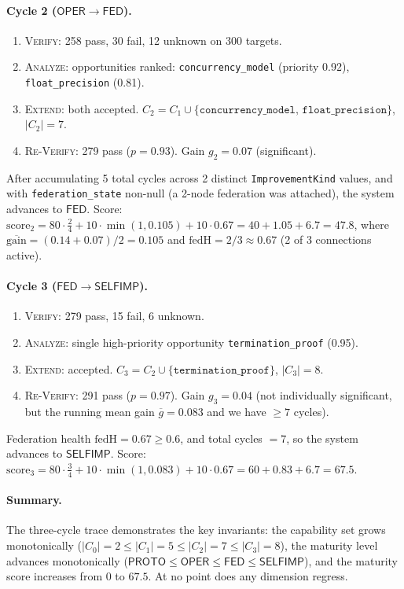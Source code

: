 \documentclass[11pt]{article}
\newcommand{\gain}{\mathrm{gain}}           %
\newcommand{\score}{\mathrm{score}}         %
\newcommand{\fedH}{\mathrm{fedH}}           %
\newcommand{\Proto}{\ensuremath{\mathsf{PROTO}}}
\newcommand{\Oper}{\ensuremath{\mathsf{OPER}}}
\newcommand{\Fed}{\ensuremath{\mathsf{FED}}}
\newcommand{\SelfImp}{\ensuremath{\mathsf{SELFIMP}}}
\newcommand{\Verify}{\textsc{Verify}}
\newcommand{\Analyze}{\textsc{Analyze}}
\newcommand{\Extend}{\textsc{Extend}}
\newcommand{\ReVerify}{\textsc{Re-Verify}}
\begin{document}
\paragraph{Cycle 2 ($\Oper \to \Fed$).}
\begin{enumerate}
  \item \Verify{}: 258 pass, 30 fail, 12 unknown on 300 targets.
  \item \Analyze{}: opportunities ranked: \texttt{concurrency\_model} (priority
    0.92), \texttt{float\_precision} (0.81).
  \item \Extend{}: both accepted. $C_2 = C_1 \cup
    \{\texttt{concurrency\_model},\, \texttt{float\_precision}\}$, $|C_2| = 7$.
  \item \ReVerify{}: 279 pass ($p = 0.93$). Gain $g_2 = 0.07$ (significant).
\end{enumerate}
After accumulating 5 total cycles across 2 distinct \texttt{ImprovementKind}
values, and with \texttt{federation\_state} non-null (a 2-node federation was
attached), the system advances to $\Fed$.  Score:
$\score_2 = 80 \cdot \tfrac{2}{4} + 10 \cdot \min(1, 0.105)
           + 10 \cdot 0.67 = 40 + 1.05 + 6.7 = 47.8$,
where $\overline{\gain} = (0.14 + 0.07)/2 = 0.105$ and
$\fedH = 2/3 \approx 0.67$ (2 of 3 connections active).

\paragraph{Cycle 3 ($\Fed \to \SelfImp$).}
\begin{enumerate}
  \item \Verify{}: 279 pass, 15 fail, 6 unknown.
  \item \Analyze{}: single high-priority opportunity
    \texttt{termination\_proof} (0.95).
  \item \Extend{}: accepted. $C_3 = C_2 \cup \{\texttt{termination\_proof}\}$,
    $|C_3| = 8$.
  \item \ReVerify{}: 291 pass ($p = 0.97$). Gain $g_3 = 0.04$ (not
    individually significant, but the running mean gain
    $\overline{g} = 0.083$ and we have $\geq 7$ cycles).
\end{enumerate}
Federation health $\fedH = 0.67 \geq 0.6$, and total cycles $= 7$, so
the system advances to $\SelfImp$.  Score:
$\score_3 = 80 \cdot \tfrac{3}{4} + 10 \cdot \min(1, 0.083)
           + 10 \cdot 0.67 = 60 + 0.83 + 6.7 = 67.5$.

\paragraph{Summary.}
The three-cycle trace demonstrates the key invariants: the capability set
grows monotonically ($|C_0| = 2 \leq |C_1| = 5 \leq |C_2| = 7 \leq
|C_3| = 8$), the maturity level advances monotonically
($\Proto \leq \Oper \leq \Fed \leq \SelfImp$), and the maturity score
increases from $0$ to $67.5$.  At no point does any dimension regress.
\end{document}
